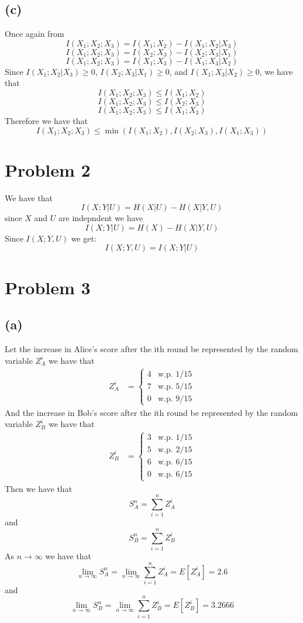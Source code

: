 \subsection*{(c)}
Once again from 
$$I(X_1;X_2;X_3)=I(X_1;X_2)-I(X_1;X_2|X_3)$$
$$I(X_1;X_2;X_3)=I(X_2;X_3)-I(X_2;X_3|X_1)$$
$$I(X_1;X_2;X_3)=I(X_1;X_3)-I(X_1;X_3|X_2)$$
Since $I(X_1;X_2|X_3)\geq0$, $I(X_2;X_3|X_1)\geq0$, and $I(X_1;X_3|X_2)\geq0$, we have that
$$I(X_1;X_2;X_3)\leq I(X_1;X_2)$$
$$I(X_1;X_2;X_3)\leq I(X_2;X_3)$$
$$I(X_1;X_2;X_3)\leq I(X_1;X_3)$$
Therefore we have that
$$I(X_1;X_2;X_3)\leq\min(I(X_1;X_2),I(X_2;X_3),I(X_1;X_3))$$
\section*{Problem 2}
We have that 
$$I(X;Y|U)=H(X|U)-H(X|Y,U)$$
since $X$ and $U$ are indepndent we have
$$I(X;Y|U)=H(X)-H(X|Y,U)$$
Since $I(X;Y,U)$ we get:
$$I(X;Y,U)=I(X;Y|U)$$

\section*{Problem 3}
\subsection*{(a)}
Let the increase in Alice's score after the ith round be 
represented by the random variable $Z_A^i$ we have that
\begin{align*}
    Z_A^i&=\begin{cases}
        4 & \text{w.p. } 1/15\\
        7 & \text{w.p. } 5/15\\
        0 & \text{w.p. } 9/15
    \end{cases}
\end{align*}
And the increase in Bob's score after the ith round be
represented by the random variable $Z_B^i$ we have that
\begin{align*}
    Z_B^i&=\begin{cases}
        3 & \text{w.p. } 1/15\\
        5 & \text{w.p. } 2/15\\
        6 & \text{w.p. } 6/15\\
        0 & \text{w.p. } 6/15
    \end{cases}
\end{align*}
Then we have that 
$$S_A^n=\sum_{i=1}^n Z_A^i$$
and
$$S_B^n=\sum_{i=1}^n Z_B^i$$
As $n\to\infty$ we have that
$$\lim_{n\to\infty}S_A^n=\lim_{n\to\infty}\sum_{i=1}^n Z_A^i=E[Z_A^i]=\boxed{2.6}$$
and
$$\lim_{n\to\infty}S_B^n=\lim_{n\to\infty}\sum_{i=1}^n Z_B^i=E[Z_B^i]=\boxed{3.2666}$$
